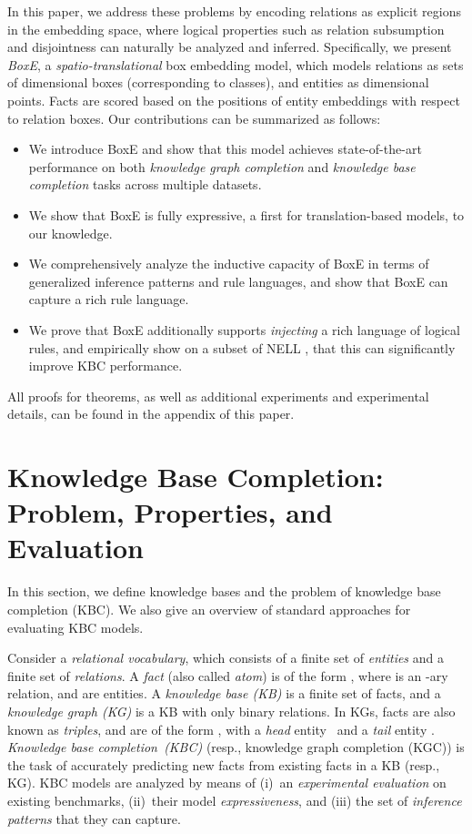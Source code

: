 \documentclass{article}
\begin{document}
In this paper, we address these problems by encoding relations as explicit regions in the embedding space, where logical properties such as relation subsumption and disjointness can naturally be analyzed and inferred. Specifically, we present \emph{BoxE}, a \emph{spatio-translational} box embedding model, which models relations as sets of dimensional boxes (corresponding to classes), and entities as dimensional points. 
Facts are scored based on the positions of entity embeddings with respect to relation boxes. Our contributions can be summarized as follows:
\begin{itemize}[--,leftmargin=8pt]
	\item We introduce BoxE and show that this model achieves state-of-the-art performance on both \emph{knowledge graph completion} and \emph{knowledge base completion} tasks across multiple datasets.
	
	\item We show that BoxE is fully expressive, a first for translation-based models, to our knowledge. 

	\item We comprehensively analyze the inductive capacity of BoxE in terms of generalized inference patterns and rule languages, and show that BoxE can capture a rich rule language.

	\item We prove that BoxE additionally supports \emph{injecting} a rich language of logical rules, and empirically show on a subset of NELL \cite{MitchellBCM18}, that this can significantly improve KBC performance.
\end{itemize}

All proofs for theorems, as well as additional experiments and experimental details, can be found in the appendix of this paper. 


\section{Knowledge Base Completion: Problem, Properties, and Evaluation}
In this section, we define knowledge bases and the problem of knowledge base completion (KBC). We also give an overview of standard approaches for evaluating KBC models.

Consider a \emph{relational vocabulary}, which consists of a finite set  of \emph{entities} and a finite set  of \emph{relations}. A \emph{fact} (also called \emph{atom}) is of the form , where  is an -ary relation, and  are entities. 
A \emph{knowledge base (KB)} is a finite set of facts, and a \emph{knowledge graph (KG)} is a KB with only binary relations. In KGs, facts are also known as \emph{triples}, and are of the form ,  with a \emph{head} entity~ and a \emph{tail} entity . \emph{Knowledge base completion~(KBC)} (resp., knowledge graph completion (KGC)) is the task of accurately predicting new facts from existing facts in a KB (resp., KG). KBC models are analyzed by means of (i)~an \emph{experimental evaluation} on existing benchmarks, (ii)~their model \emph{expressiveness}, and (iii) the set of \emph{inference patterns} that they can capture.
\end{document}
